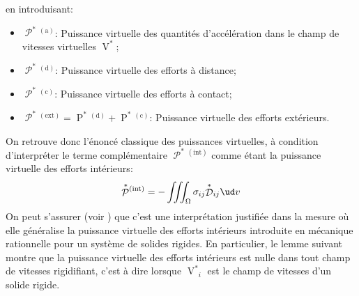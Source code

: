 en introduisant:
\begin{itemize}
    \item $\displaystyle \mathop{\mathcal{P}}^{\ast}{\!}^{(\text{a})}$: Puissance virtuelle des quantités d'accélération dans le champ de vitesses virtuelles $\displaystyle\mathop{V}^{\ast}$;
    \item $\displaystyle \mathop{\mathcal{P}}^{\ast}{\!}^{(\text{d})}$: Puissance virtuelle des efforts à distance;
    \item $\displaystyle \mathop{\mathcal{P}}^{\ast}{\!}^{(\text{c})}$: Puissance virtuelle des efforts à contact;
    \item $\displaystyle \mathop{\mathcal{P}}^{\ast}{\!}^{(\text{ext})} = \mathop{P}^{\ast}{\!}^{(\text{d})} + \mathop{P}^{\ast}{\!}^{(\text{c})}$: Puissance virtuelle des efforts extérieurs.
\end{itemize}
On retrouve donc l'énoncé classique des puissances virtuelles, à condition d'interpréter le terme complémentaire $\displaystyle \mathop{\mathcal{P}}^{\ast}{\!}^{(\text{int})}$ comme étant la puissance virtuelle des efforts intérieurs:
\begin{equation}
    \mathop{\mathcal{P}}^{\ast}{\!}^{(\text{int})}=-\iiint_\Omega \sigma_{ij}{\mathop{\mathcal{D}}^{\ast}}_{ij} \ud v
    \label{eq:Ch01-025}
\end{equation}
On peut s'assurer (voir \cite{Germain-62,Gontier-69}) que c'est une interprétation justifiée dans la mesure où elle généralise la puissance virtuelle des efforts intérieurs introduite en mécanique rationnelle pour un système de solides rigides.
En particulier, le lemme suivant montre que la puissance virtuelle des efforts intérieurs est nulle dans tout champ de vitesses rigidifiant, c'est à dire lorsque $\displaystyle {\mathop{V}^{\ast}}_i$ est le champ de vitesses d'un solide rigide. 

